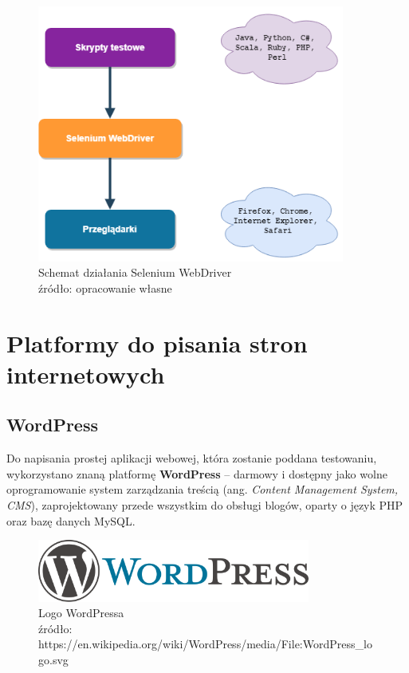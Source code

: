 \begin{figure}[H]
\centering
\captionsetup{justification=centering}
\includegraphics[width=0.9\textwidth]{SeleniumWorkflow.png}
\caption[Schemat działania Selenium WebDriver]{\label{fig:ham}Schemat działania Selenium WebDriver \\ źródło: opracowanie własne}
\end{figure}


\section{Platformy do pisania stron internetowych}
\subsection{WordPress}
Do napisania prostej aplikacji webowej, która zostanie poddana testowaniu, wykorzystano znaną platformę \textbf{WordPress} – darmowy i dostępny jako wolne oprogramowanie system zarządzania treścią (ang. \textit{Content Management System, CMS}), zaprojektowany przede wszystkim do obsługi blogów, oparty o język PHP oraz bazę danych MySQL. \cite{wpa}

\begin{figure}[H]
\centering
\captionsetup{justification=centering}
\includegraphics[width=0.8\textwidth]{WordPress_logo.png}
\caption[Logo WordPressa]{\label{fig:ham}Logo WordPressa \\ źródło: https://en.wikipedia.org/wiki/WordPress/media/File:WordPress\_logo.svg}
\end{figure}



